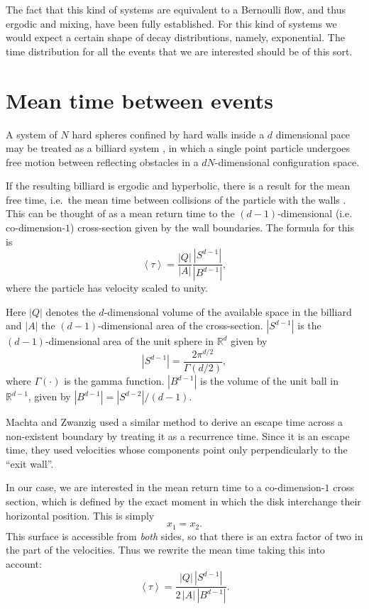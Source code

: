 \documentclass[letterpaper,10pt]{article}
\newcommand{\mean}[1]{\left \langle #1 \right \rangle}
\newcommand{\RR}{\mathbb{R}}
\begin{document}
The fact that this kind of systems are equivalent to a Bernoulli flow,
and thus ergodic and mixing, have been fully established. For this kind
of systems we would expect a certain shape of decay distributions, namely, 
exponential. The time distribution for all the events that we are
interested should be of this sort.  


\section{Mean time between events}

A system of $N$ hard spheres confined by hard walls inside a $d$ dimensional
pace may be treated as a billiard system \cite{Sinai70, MarkChern}, 
in which a single point  particle undergoes free motion between reflecting obstacles 
in a $ d N $-dimensional configuration space. 

If the resulting billiard is ergodic and hyperbolic, 
there is a result for the mean free time, i.e.\ the mean time between 
collisions of the particle with the walls \cite{MarkChern}. 
This can be thought of as a mean return time to the $(d-1)$-dimensional 
(i.e. co-dimension-$1$) cross-section given by the wall boundaries.
The formula for this is
\begin{equation}
 \mean{\tau} = \frac{|Q|}{|A|} \frac{|S^{d-1}|}{|B^{d-1}|},
\end{equation}
where the particle has velocity scaled to unity.

Here $|Q|$ denotes the $d$-dimensional volume of the available space in the billiard and 
$|A|$ the $(d-1)$-dimensional area of the cross-section.
 $|S^{d-1}|$ is the $(d-1)$-dimensional area of the unit sphere in $\RR^d$ given by
\begin{equation}
  |S^{d-1}| = \frac{2 \pi^{d/2}}{\Gamma(d/2)},
\end{equation}
where $\Gamma(\cdot)$ is the gamma function. 
$|B^{d-1}|$ is the volume of the unit ball 
in $\RR^{d-1}$, given by $|B^{d-1}| = |S^{d-2}| / (d-1)$.

Machta and Zwanzig \cite{MachtaZwan} used a similar method to derive an escape 
time across a non-existent boundary by treating it as a recurrence time.
Since it is an escape time, they used velocities whose components point only 
perpendicularly to the ``exit wall''.

In our case, we are interested in the mean return time to a co-dimension-$1$ cross section, 
which is defined by the exact moment
in which the disk interchange their horizontal position. This is simply
\begin{equation} \label{condchoque}
x_1 = x_2.
\end{equation}
This surface is accessible from \emph{both} sides, 
so that there is an extra factor of two in the part of the velocities. Thus 
we rewrite the mean time taking this into account: 
\begin{equation}
 \mean{\tau} = \frac{|Q| \, |S^{d-1}|} {2 \, |A| \, |B^{d-1}|}.	
\end{equation}
\end{document}

